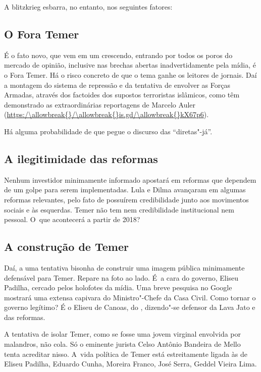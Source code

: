A blitzkrieg esbarra, no entanto, nos seguintes fatores:

\subsection{O Fora Temer}

É o fato novo, que vem em um crescendo, entrando por todos os poros do
mercado de opinião, inclusive nas brechas abertas inadvertidamente pela
mídia, é o Fora Temer. Há o risco concreto de que o tema ganhe os
leitores de jornais. Daí a montagem do sistema de repressão e da
tentativa de envolver as Forças Armadas, através dos factoides dos
supostos terroristas islâmicos, como têm demonstrado as extraordinárias
reportagens de Marcelo Auler (\url{https:/\allowbreak{}/\allowbreak{}is.gd/\allowbreak{}kX67p6}).

Há alguma probabilidade de que pegue o discurso das ``diretas"-já''.

\subsection{A ilegitimidade das reformas}

Nenhum investidor minimamente informado apostará em reformas que
dependem de um golpe para serem implementadas. Lula e Dilma avançaram em
algumas reformas relevantes, pelo fato de possuírem credibilidade junto
aos movimentos sociais e às esquerdas. Temer não tem nem credibilidade
institucional nem pessoal. O~que acontecerá a partir de 2018?

\subsection{\textbf{A construção de Temer}}

Daí, a uma tentativa bisonha de construir uma imagem pública minimamente
defensável para Temer. Repare na foto ao lado. É~a cara do governo,
Eliseu Padilha, cercado pelos holofotes da mídia. Uma breve pesquisa no
Google mostrará uma extensa capivara do Ministro"-Chefe da Casa Civil.
Como tornar o governo legítimo? É o Eliseu de Canoas, do ,
dizendo"-se defensor da Lava Jato e das reformas.

A tentativa de isolar Temer, como se fosse uma jovem virginal envolvida
por malandros, não cola. Só o eminente jurista Celso Antônio Bandeira de
Mello tenta acreditar nisso. A~vida política de Temer está estreitamente
ligada às de Eliseu Padilha, Eduardo Cunha, Moreira Franco, José Serra,
Geddel Vieira Lima.


